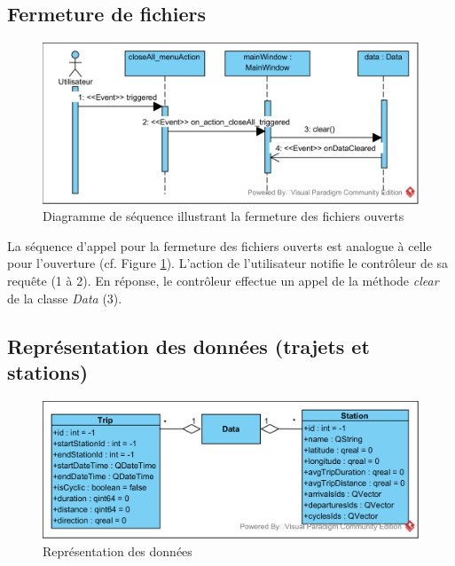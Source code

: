 \documentclass[12pt]{article}
\begin{document}
		\subsection{Fermeture de fichiers}
		\begin{figure}[!h]
		\begin{center}
		\includegraphics[scale=1]{dia_sequence_closeFiles.png}
		\caption{Diagramme de séquence illustrant la fermeture des fichiers ouverts}
		\label{fig:seq_closeFiles}
		\end{center}
		\end{figure}
			
		La séquence d’appel pour la fermeture des fichiers ouverts est analogue à celle pour l’ouverture (cf. Figure \ref{fig:seq_closeFiles}). L’action de l’utilisateur notifie le contrôleur de sa requête (1 à 2). En réponse, le contrôleur effectue un appel de la méthode \textit{clear} de la classe \textit{Data} (3).
			
			
		\subsection{Représentation des données (trajets et stations)}
		\begin{figure}[!h]
		\begin{center}
		\includegraphics[scale=1]{dia_class_data.png}
		\caption{Représentation des données}
		\end{center}
		\end{figure}		
			
\end{document}
